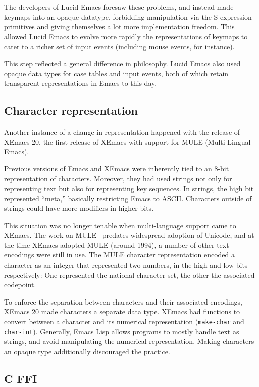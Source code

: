 \documentclass[format=acmsmall, review]{acmart}
\newcommand \Elisp {Emacs Lisp}
\begin{document}
The developers of Lucid Emacs foresaw these problems, and
instead made keymaps into an opaque datatype, forbidding manipulation via the
S-expression primitives and giving themselves a lot more implementation
freedom.  This allowed Lucid Emacs to evolve more rapidly the
representations of keymaps to cater to a richer set of input events
(including mouse events, for instance).

This step reflected a general difference in philosophy.  Lucid Emacs
also used opaque data types for case tables and input events, both of
which retain transparent representations in Emacs to this day.

\subsection{Character representation}
\label{sec:character-representation}

Another instance of a change in representation happened with the
release of XEmacs 20, the first release of XEmacs with support for
MULE (Multi-Lingual Emacs).

Previous versions of Emacs and XEmacs were inherently tied to an 8-bit
representation of characters.  Moreover, they had used strings not
only for representing text but also for representing key sequences.
In strings, the high bit represented ``meta,'' basically restricting
Emacs to ASCII.  Characters outside of strings could have more
modifiers in higher bits.

This situation was no longer tenable when multi-language support came
to XEmacs.  The work on MULE~\cite{Ohmaki2002} predates widespread
adoption of Unicode, and at the time XEmacs adopted MULE (around
1994), a number of other text encodings were still in use.  The MULE
character representation encoded a character as an integer that
represented two numbers, in the high and low bits respectively: One
represented the national character set, the other the associated
codepoint.

To enforce the separation between characters and their associated
encodings, XEmacs 20 made characters a separate data type.  XEmacs had
functions to convert between a character and its numerical
representation (\texttt{make-char} and \texttt{char-int}).  Generally,
\Elisp{} allows programs to mostly handle text as strings,
and avoid manipulating the numerical representation.  Making
characters an opaque type additionally discouraged the practice.

\subsection{C FFI}
\end{document}
